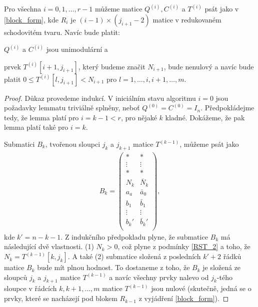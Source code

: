 \begin{lem} \label{RST_algo_lemma}
Pro všechna $ i = 0, 1, \dots, r - 1 $ můžeme matice $ Q^{(i)}, C^{(i)} $ a  $ T^{(i)} $
psát jako v \ref{block_form}, kde $ R_i $ je $ (i - 1) \times (j_{i + 1} - 2) $
matice v redukovaném schodovitém tvaru. Navíc bude platit:
\begin{Cond}
    \item $ Q^{(i)} $ a $ C^{(i)} $ jsou unimodulární a
    \item \label{RST_2} prvek $ T^{(i)}[i+1, j_{i+1}] $, který budeme značit $ N_{i + 1} $, bude
    nenulový a navíc bude platit $ 0 \leq T^{(i)}[l, j_{i+1}] < N_{i+1} $ pro
    $ l = 1, \dots, i, i+1, \dots, m $.
\end{Cond}
\end{lem}
\begin{proof}
Důkaz provedeme indukcí. V iniciálním stavu algoritmu $ i = 0 $ jsou požadavky lemmatu
triviálně splněny, neboť $ Q^{(0)} = C^{(0)} = I_n $. Předpokládejme tedy, že
lemma platí pro $ i = k - 1 < r $, pro nějaké $ k $ kladné.
Dokážeme, že pak lemma platí také pro $ i = k $.

Submatici $ B_k $, tvořenou sloupci $ j_k $ a $ j_{k+1} $ matice
$ T^{(k-1)} $, můžeme psát jako
\begin{align*}
B_k =
    \begin{pmatrix}
        \ast   & \ast   \\
        \vdots & \vdots \\
        \ast   & \ast   \\
        N_k    & \bar{N}_k \\
        a_a    & \bar{a}_0  \\
        b_1    & \bar{b}_1  \\
        \vdots & \vdots  \\
        b_k'    & \bar{b}_k'  \\
    \end{pmatrix},
\end{align*}
kde $ k' = n - k - 1 $. Z indukčního předpokladu plyne, že submatice $ B_k $ má
následující dvě vlastnosti.
(1) $ N_k > 0 $, což plyne z podmínky \ref{RST_2} a toho, že $ N_k = T^{(k - 1)}[k, j_k] $.
A také (2) submatice složená z posledních $ k' + 2 $ řádků matice $ B_k $
bude mít plnou hodnost. To dostaneme z toho, že $ B_k $ je složená ze sloupců
$ j_k $ a $ j_{k+1} $ matice $ T^{(k - 1)} $ a navíc všechny prvky nalevo od
$ j_k $-tého sloupce v řádcích $k, k+1, \dots, m $ matice $ T^{(k - 1)} $ jsou nulové
(skutečně, jedná se o prvky, které se nacházejí pod blokem $ R_{k-1} $ z vyjádření
\ref{block_form}).


\end{proof}
